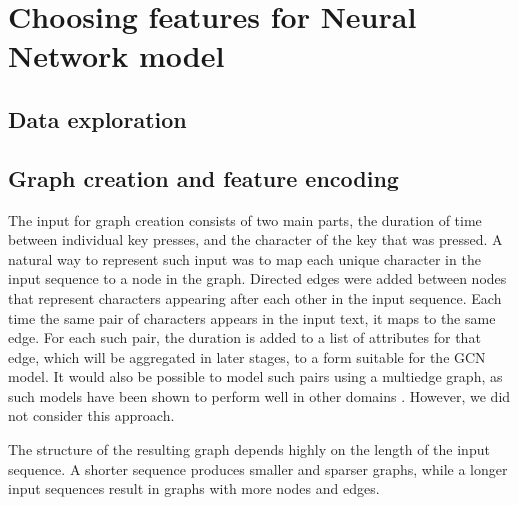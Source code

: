 
\section{Choosing features for Neural Network model}


\subsection{Data exploration}

\subsection{Graph creation and feature encoding}
The input for graph creation consists of two main parts, the duration of time between individual key presses, and the character of the key that was pressed.
A natural way to represent such input was to map each unique character in the input sequence to a node in the graph. 
Directed edges were added between nodes that represent characters appearing after each other in the input sequence. 
Each time the same pair of characters appears in the input text, it maps to the same edge. For each such pair, the duration is added to a list of attributes for that edge, which will be aggregated in later stages, to a form suitable for the GCN model. It would also be possible to model such pairs using a multiedge graph, as such models have been shown to perform well in other domains . However, we did not consider this approach. 



The structure of the resulting graph depends highly on the length of the input sequence. A shorter sequence produces smaller and sparser graphs, while a longer input sequences result in graphs with more nodes and edges. 

\\

